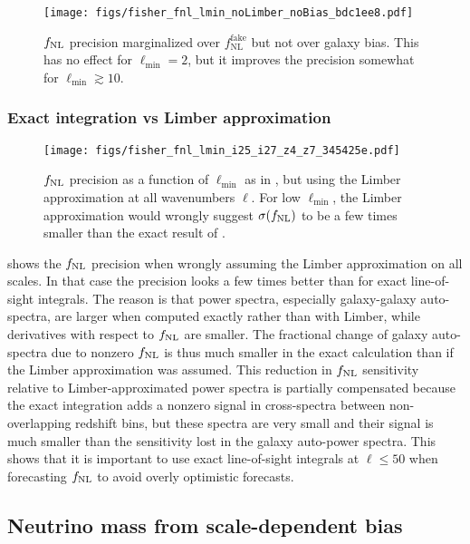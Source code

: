 \documentclass[prd,superscriptaddress,floatfix,notitlepage,nofootinbib,reprint]{revtex4-1} %
\begin{document}
\begin{figure}[tbp]
\texttt{[image: figs/fisher\_fnl\_lmin\_noLimber\_noBias\_bdc1ee8.pdf]}
\caption{${f_\mathrm{NL}}$ precision marginalized over $f_\mathrm{NL}^\mathrm{fake}$ but not over galaxy bias.
This has no effect for $\ell_\mathrm{min}=2$, but it improves the precision somewhat for $\ell_\mathrm{min}\gtrsim 10$.
}
\label{fig:fnl_lmin_noBias}
\end{figure}






\subsubsection{Exact integration vs Limber approximation}
\label{se:FnlLimberDiscussion}

\begin{figure}[tbp]
\texttt{[image: figs/fisher\_fnl\_lmin\_i25\_i27\_z4\_z7\_345425e.pdf]}
\caption{
${f_\mathrm{NL}}$ precision as a function of $\ell_\mathrm{min}$ as in , but using the Limber approximation at all wavenumbers $\ell$.
For low $\ell_\mathrm{min}$, the Limber approximation would wrongly suggest $\sigma({f_\mathrm{NL}})$ to be a few times smaller than the exact result of .
}
\label{fig:fnl_LSST_S4_limber}
\end{figure}

 shows the ${f_\mathrm{NL}}$ precision when wrongly assuming the Limber approximation on all scales. 
In that case the precision looks a few times better than for exact line-of-sight integrals.
The reason is that power spectra, especially galaxy-galaxy auto-spectra, are larger when computed exactly rather than with Limber, while derivatives with respect to ${f_\mathrm{NL}}$ are smaller.
The fractional change of galaxy auto-spectra due to nonzero ${f_\mathrm{NL}}$ is thus much smaller in the exact calculation than if the Limber approximation was assumed.
This reduction in ${f_\mathrm{NL}}$ sensitivity relative to Limber-approximated power spectra is partially compensated because the exact integration adds a nonzero signal in cross-spectra between non-overlapping redshift bins, but these spectra are very small and their signal is much smaller than the sensitivity lost in the galaxy auto-power spectra.
This shows that it is important to use exact line-of-sight integrals at $\ell\le 50$ when forecasting ${f_\mathrm{NL}}$ to avoid overly optimistic forecasts.



\subsection{Neutrino mass from scale-dependent bias}
\end{document}
